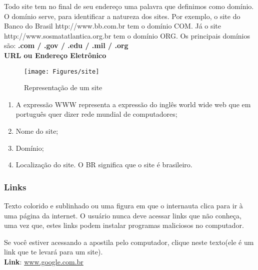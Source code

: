\documentclass[hidelinks,12pt]{article}
\begin{document}
		Todo site tem no final de seu endereço uma palavra que definimos como domínio. O domínio serve, para identificar a natureza dos sites. Por exemplo, o site do Banco do Brasil http://www.bb.com.br tem o domínio COM. Já o site http://www.sosmatatlantica.org.br tem o domínio ORG. Os principais domínios são: \textbf{.com / .gov / .edu / .mil / .org}\\

		 \textbf{URL ou Endereço Eletrônico}

		\begin{figure}[!h]
			\centering
			\texttt{[image: Figures/site]}
			\label{fig:site}
			\caption{Representação de um site}
		\end{figure}

		\begin{enumerate}
			\item A expressão WWW representa a expressão do inglês world wide web que em português quer dizer rede mundial de computadores;

			\item Nome do site;

			\item Domínio;

			\item Localização do site. O BR significa que o site é brasileiro.

		\end{enumerate}

	\subsubsection{Links}
		Texto colorido e sublinhado ou uma figura em que o internauta clica para ir à uma página da internet. O usuário nunca deve acessar links que não conheça, uma vez que, estes links podem instalar programas maliciosos no computador.

		Se você estiver acessando a apostila pelo computador, clique neste texto(ele é um link que te levará para um site).\\
		\textbf{Link}: \url{www.google.com.br}
\end{document}
